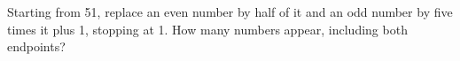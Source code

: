 Starting from 51, replace an even number by half of it and an odd number by five times it plus 1, stopping at 1. How many numbers appear, including both endpoints?
